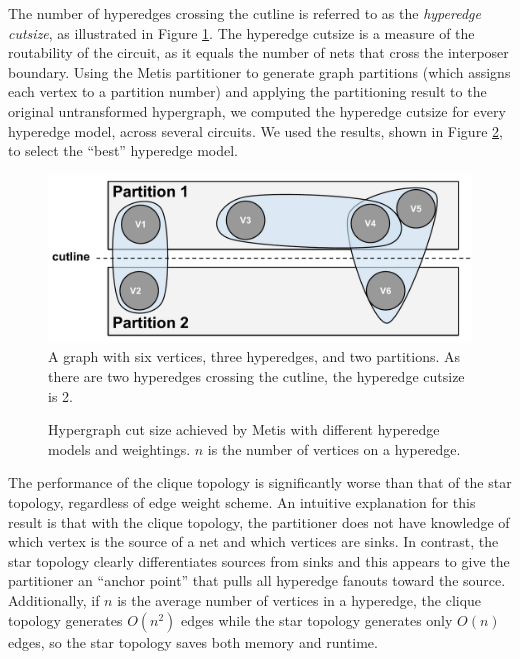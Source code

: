 The number of hyperedges crossing the cutline is referred to as the \emph{hyperedge cutsize}, as illustrated in Figure \ref{fig:hyperedge_cutline}. The hyperedge cutsize is a measure of the routability of the circuit, as it equals the number of nets that cross the interposer boundary. Using the Metis partitioner to generate graph partitions (which assigns each vertex to a partition number) and applying the partitioning result to the original untransformed hypergraph, we computed the hyperedge cutsize for every hyperedge model, across several circuits. We used the results, shown in Figure \ref{fig:graph_topology_cutsize}, to select the ``best'' hyperedge model.

\begin{figure}[!htbp]
\centering
\includegraphics[width=\linewidth]{hyperedge_cutline.pdf}
\caption{A graph with six vertices, three hyperedges, and two partitions. As there are two hyperedges crossing the cutline, the hyperedge cutsize is 2.}
\label{fig:hyperedge_cutline}
\end{figure}

\begin{figure}[!htbp]
\centering
%

\caption{Hypergraph cut size achieved by Metis with different hyperedge models and weightings. $n$ is the number of vertices on a hyperedge.}
\label{fig:graph_topology_cutsize}
\end{figure}

The performance of the clique topology is significantly worse than that of the star topology, regardless of edge weight scheme. An intuitive explanation for this result is that with the clique topology, the partitioner does not have knowledge of which vertex is the source of a net and which vertices are sinks. In contrast, the star topology clearly differentiates sources from sinks and this appears to give the partitioner an “anchor point” that pulls all hyperedge fanouts toward the source. Additionally, if $n$ is the average number of vertices in a hyperedge, the clique topology generates $O(n^2)$ edges while the star topology generates only $O(n)$ edges, so the star topology saves both memory and runtime.

